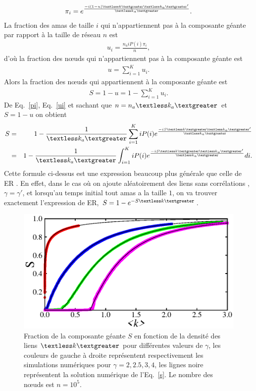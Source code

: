 \begin{eqnarray}
\pi_{i}=e^{\frac{-i(1-u)\km\kma'}{\kma}}.
\label{pi}
\end{eqnarray}
La fraction des amas de taille $i$ qui n'appartiennent pas à la composante géante par rapport à la taille de réseau $n$ est 
\begin{eqnarray}
u_{i}=\frac{n_aiP(i)\pi_i}{n},
\label{ui}
\end{eqnarray}
d'où la fraction des nœuds qui  n'appartiennent pas  à la composante géante est
\begin{eqnarray}
u=\sum_{i=1}^K u_i.
\end{eqnarray}
Alors la fraction des nœuds qui appartiennent à la composante géante est 
\begin{eqnarray}
S=1-u=1-\sum_{i=1}^K u_i.
\end{eqnarray}
De Eq.~\eqref{pi}, Eq.~\eqref{ui} et sachant que $n=n_a\kma$ et $S=1-u$ on obtient
\begin{eqnarray}
S&=&1-\frac{1}{\kma}\sum_{i=1}^KiP(i)e^{\frac{-iS\km\kma'}{\kma}}\nonumber \\
&=& 1-\frac{1}{\kma}\int_{i=1}^KiP(i)e^{\frac{-iS\km\kma'}{\kma}}di.
\label{s}
\end{eqnarray}
 Cette formule ci-dessus est une expression beaucoup plus générale que celle de ER \cite{Erdos-Renyi1959}. En effet, dans le cas où on ajoute aléatoirement des liens sans corrélations ,$\gamma=\gamma'$, et lorsqu'au temps initial tout amas a la taille $1$, on va trouver exactement l'expression de ER, $S=1-e^{-S\km}$.
  \begin{figure}[h!]
  	\centering
  	\includegraphics[scale=1.2]{./figures/fig-CG}
  	\caption{Fraction de la composante géante $S$ en fonction de la densité des liens $\km$ pour différentes valeurs de $\gamma$, les couleurs de gauche à droite représentent  respectivement les simulations numériques pour $\gamma=2,2.5,3,4$, les lignes noire représentent la solution numérique de l'Eq.~\eqref{s}. Le nombre des nœuds est $n=10^5$.}
  	\label{CG}
  \end{figure}
 
